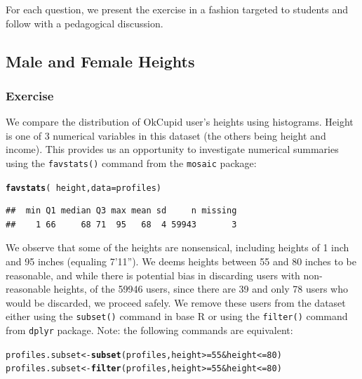 \documentclass{article}\usepackage[]{graphicx}\usepackage[]{color}
\makeatletter
\newcommand{\hlnum}[1]{\textcolor[rgb]{0.686,0.059,0.569}{#1}}%
\newcommand{\hlopt}[1]{\textcolor[rgb]{0,0,0}{#1}}%
\newcommand{\hlstd}[1]{\textcolor[rgb]{0.345,0.345,0.345}{#1}}%
\newcommand{\hlkwb}[1]{\textcolor[rgb]{0.69,0.353,0.396}{#1}}%
\newcommand{\hlkwc}[1]{\textcolor[rgb]{0.333,0.667,0.333}{#1}}%
\newcommand{\hlkwd}[1]{\textcolor[rgb]{0.737,0.353,0.396}{\textbf{#1}}}%
\newenvironment{kframe}{%
 \def\at@end@of@kframe{}%
 \ifinner\ifhmode%
  \def\at@end@of@kframe{\end{minipage}}%
  \begin{minipage}{\columnwidth}%
 \fi\fi%
 \def\FrameCommand##1{\hskip\@totalleftmargin \hskip-\fboxsep
 \colorbox{shadecolor}{##1}\hskip-\fboxsep
     \hskip-\linewidth \hskip-\@totalleftmargin \hskip\columnwidth}%
 \MakeFramed {\advance\hsize-\width
   \@totalleftmargin\z@ \linewidth\hsize
   \@setminipage}}%
 {\par\unskip\endMakeFramed%
 \at@end@of@kframe}
\newenvironment{knitrout}{}{} %
\makeatother
\begin{document}
For each question, we present the exercise in a fashion targeted to students and follow with a pedagogical discussion.





\subsection{Male and Female Heights}\label{section_height}
\subsubsection{Exercise}
We compare the distribution of OkCupid user's heights using histograms.  Height is one of 3 numerical variables in this dataset (the others being height and income).  This provides us an opportunity to investigate numerical summaries using the \verb#favstats()# command from the \verb#mosaic# package:

\begin{center}
\begin{knitrout}
\color{fgcolor}\begin{kframe}
\begin{alltt}
\hlkwd{favstats}\hlstd{(}\hlopt{~}\hlstd{height,} \hlkwc{data}\hlstd{=profiles)}
\end{alltt}
\begin{verbatim}
##  min Q1 median Q3 max mean sd     n missing
##    1 66     68 71  95   68  4 59943       3
\end{verbatim}
\end{kframe}
\end{knitrout}
\end{center}

We observe that some of the heights are nonsensical, including heights of 1 inch and 95 inches (equaling 7'11'').  We deems heights between 55 and 80 inches to be reasonable, and while there is potential bias in discarding users with non-reasonable heights, of the 59946 users, since there are 39 and only 78 users who would be discarded, we proceed safely.  We remove these users from the dataset either using the \verb#subset()# command in base R or using the \verb#filter()# command from \verb#dplyr# package. Note: the following commands are equivalent:

\begin{knitrout}
\color{fgcolor}\begin{kframe}
\begin{alltt}
\hlstd{profiles.subset} \hlkwb{<-} \hlkwd{subset}\hlstd{(profiles, height}\hlopt{>=}\hlnum{55} \hlopt{&} \hlstd{height} \hlopt{<=}\hlnum{80}\hlstd{)}
\hlstd{profiles.subset} \hlkwb{<-} \hlkwd{filter}\hlstd{(profiles, height}\hlopt{>=}\hlnum{55} \hlopt{&} \hlstd{height} \hlopt{<=}\hlnum{80}\hlstd{)}
\end{alltt}
\end{kframe}
\end{knitrout}
\end{document}
